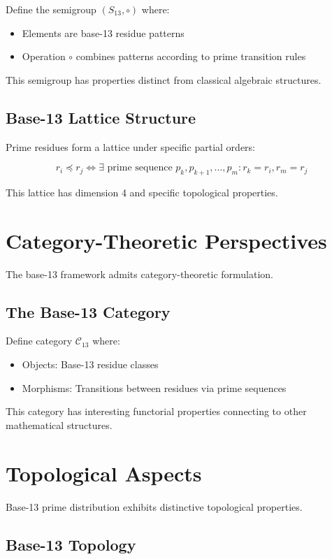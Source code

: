 \documentclass[12pt,a4paper]{report}
\begin{document}
Define the semigroup $(S_{13}, \circ)$ where:
\begin{itemize}
\item Elements are base-13 residue patterns
\item Operation $\circ$ combines patterns according to prime transition rules
\end{itemize}

This semigroup has properties distinct from classical algebraic structures.

\subsection{Base-13 Lattice Structure}

Prime residues form a lattice under specific partial orders:

\[
r_i \preceq r_j \iff \exists \text{ prime sequence } p_k, p_{k+1}, \ldots, p_m : r_k = r_i, r_m = r_j
\]

This lattice has dimension 4 and specific topological properties.

\section{Category-Theoretic Perspectives}

The base-13 framework admits category-theoretic formulation.

\subsection{The Base-13 Category}

Define category $\mathcal{C}_{13}$ where:
\begin{itemize}
\item Objects: Base-13 residue classes
\item Morphisms: Transitions between residues via prime sequences
\end{itemize}

This category has interesting functorial properties connecting to other mathematical structures.

\section{Topological Aspects}

Base-13 prime distribution exhibits distinctive topological properties.

\subsection{Base-13 Topology}
\end{document}
